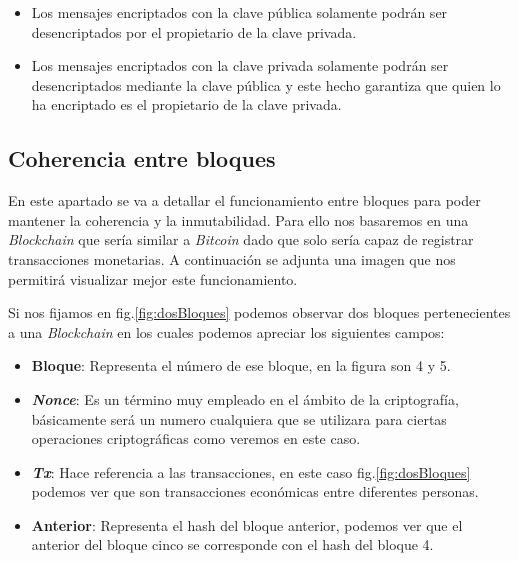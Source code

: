 \begin{itemize}
 \item Los mensajes encriptados con la clave pública solamente podrán ser desencriptados por el propietario de la clave privada.
 \item Los mensajes encriptados con la clave privada solamente podrán ser desencriptados mediante la clave pública y este hecho garantiza que quien lo ha encriptado es el propietario de la clave privada.

\end{itemize}
\subsection{Coherencia entre bloques}
En este apartado se va a detallar el funcionamiento entre bloques para poder mantener la coherencia y la inmutabilidad. Para ello nos basaremos en una \textit{Blockchain} que sería similar a \textit{Bitcoin} dado que solo sería capaz de registrar transacciones monetarias. A continuación se adjunta una imagen que nos permitirá visualizar mejor este funcionamiento.


Si nos fijamos en fig.\ref{fig:dosBloques} podemos observar dos bloques pertenecientes a una \textit{Blockchain} en los cuales podemos apreciar los siguientes campos:
\begin{itemize}
\item \textbf{Bloque}: Representa el número de ese bloque, en la figura son 4 y 5.
\item \textbf{\textit{Nonce}}: Es un término muy empleado en el ámbito de la criptografía, básicamente será un numero cualquiera que se utilizara para ciertas operaciones criptográficas como veremos en este caso.
\item \textbf{\textit{Tx}}: Hace referencia a las transacciones, en este caso fig.\ref{fig:dosBloques} podemos ver que son transacciones económicas entre diferentes personas.
\item \textbf{Anterior}: Representa el hash del bloque anterior, podemos ver que el anterior del bloque cinco se corresponde con el hash del bloque 4.
\end{itemize}

